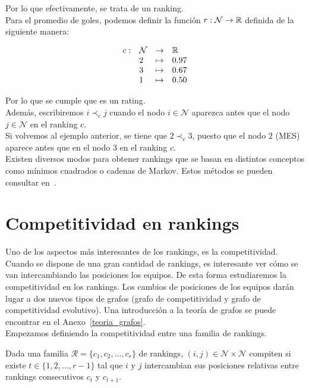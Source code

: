Por lo que efectivamente, se trata de un ranking.\\

Para el promedio de goles, podemos definir la función $r : \mathcal{N} \to \mathbb{R}$ definida de la siguiente manera:

\[ \begin{array}{rlll}
c: & \mathcal{N} & \to & \mathbb{R}\\
& 2 & \mapsto & 0.97\\
& 3 & \mapsto & 0.67\\
& 1 & \mapsto & 0.50
\end{array} \] 

Por lo que se cumple que es un rating.\\

Además, escribiremos $i \prec_c j$ cuando el nodo $i \in \mathcal{N}$ aparezca antes que el nodo $j \in \mathcal{N}$ en el ranking $c$.\\

Si volvemos al ejemplo anterior, se tiene que $2 \prec_c 3$, puesto que el nodo $2$ (MES) aparece antes que en el nodo $3$ en el ranking $c$.\\

Existen diversos modos para obtener rankings que se basan en distintos conceptos como mínimos cuadrados o cadenas de Markov. Estos métodos se pueden consultar en~\cite{langville2012s}.

\section{Competitividad en rankings}

Uno de los aspectos más interesantes de los rankings, es la competitividad. Cuando se dispone de una gran cantidad de rankings, es interesante ver cómo se van intercambiando las posiciones los equipos. De esta forma estudiaremos la competitividad en los rankings. Los cambios de posiciones de los equipos darán lugar a dos nuevos tipos de grafos (grafo de competitividad y grafo de competitividad evolutivo). Una introducción a la teoría de grafos se puede encontrar en el Anexo~\ref{teoria_grafos}.\\

Empezamos definiendo la competitividad entre una familia de rankings.

\begin{defi}
Dada una familia $\mathcal{R} = \{c_1, c_2, \dots, c_r\}$ de rankings, 
 $(i,j) \in \mathcal{N} \times \mathcal{N}$ compiten si existe $t \in \{1,2,\dots, r-1\}$ tal que $i$ y $j$ intercambian sus posiciones relativas entre rankings consecutivos $c_t$ y $c_{t+1}$.
\end{defi}

